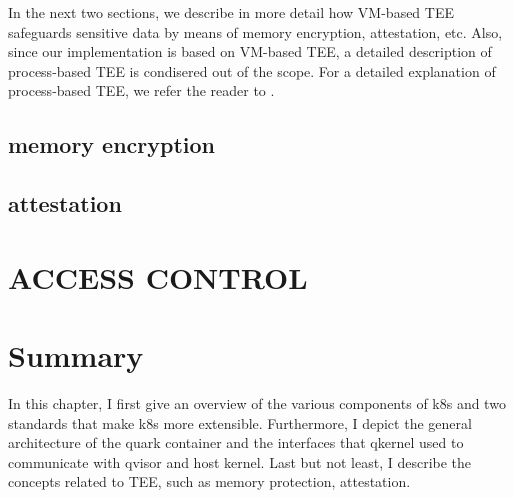 In the next two sections, we describe in more detail how VM-based TEE safeguards sensitive data by means of memory encryption, attestation, etc. Also, since our implementation  is based on VM-based TEE, 
a detailed description of process-based TEE is condisered out of the scope. For a detailed explanation of process-based TEE, we refer the reader to \cite*{cryptoeprint:2016/086} \cite*{10.1145/2487726.2488370} \cite*{SGX_PAPER_LIST}.


\subsection{memory encryption}
\subsection{attestation}

\section{ACCESS CONTROL}


\section{Summary}
In this chapter, I first give an overview of the various components of k8s and two standards that make k8s more extensible. Furthermore, I depict the general architecture of the quark container 
and the interfaces that qkernel used to communicate with qvisor and host kernel. Last but not least, I describe the concepts related to TEE, such as memory protection, attestation.

\cleardoublepage

